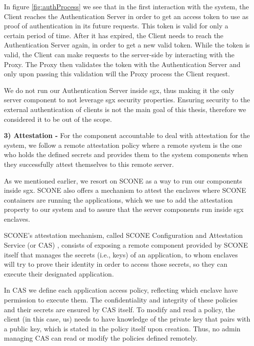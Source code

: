 In figure \ref{fig:authProcess} we see that in the first interaction with the system, the Client reaches the Authentication Server in order to get an access token to use as proof of authentication in its future requests. This token is valid for only a certain period of time. After it has expired, the Client needs to reach the Authentication Server again, in order to get a new valid token. While the token is valid, the Client can make requests to the server-side by interacting with the Proxy. The Proxy then validates the token with the Authentication Server and only upon passing this validation will the Proxy process the Client request.

We do not run our Authentication Server inside \gls{sgx}, thus making it the only server component to not leverage \gls{sgx} security properties. Ensuring security to the external authentication of clients is not the main goal of this thesis, therefore we considered it to be out of the scope.

\vspace{5mm} 

\textbf{3) Attestation -}
For the component accountable to deal with attestation for the system, we follow a remote attestation policy where a remote system is the one who holds the defined secrets and provides them to the system components when they successfully attest themselves to this remote server.

As we mentioned earlier, we resort on SCONE as a way to run our components inside \gls{sgx}. SCONE also offers a mechanism to attest the enclaves where SCONE containers are running the applications, which we use to add the attestation property to our system and to assure that the server components run inside \gls{sgx} enclaves. 

SCONE's attestation mechanism, called SCONE Configuration and Attestation Service (or CAS) \cite{sconeCAS}, consists of exposing a remote component provided by SCONE itself that manages the secrets (i.e., keys) of an application, to whom enclaves will try to prove their identity in order to access those secrets, so they can execute their designated application. 

In CAS we define each application access policy, reflecting which enclave have permission to execute them. The confidentiality and integrity of these policies and their secrets are ensured by CAS itself. To modify and read a policy, the client (in this case, us) needs to have knowledge of the private key that pairs with a public key, which is stated in the policy itself upon creation. Thus, no admin managing CAS can read or modify the policies defined remotely.




